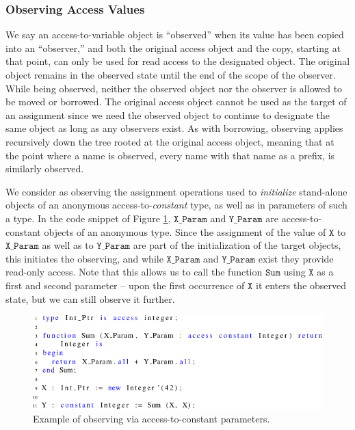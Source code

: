 \documentclass[runningheads]{llncs}
\newcommand\var[1]{\ensuremath{\mathtt{#1}}}
\newcommand{\keyword}[1]{\textsf{#1}}
\begin{document}
\subsubsection{Observing Access Values}
\label{sec:observing}

We say an access-to-variable object is ``observed'' when its value has been copied into an ``observer,'' and both the original
access object and the copy, starting at that point, can only be used for read access to the designated object.
The original object remains in the observed state until the end of the scope of the observer. While being observed, neither the observed object nor the observer is allowed to be moved or
borrowed. The original access object cannot be used as the target of an assignment since we need the observed object to continue
to designate the same object as long as any observers exist.  As with borrowing, observing applies recursively down the tree rooted at the original access object, meaning that at the point where a name is observed,
every name with that name as a prefix, is similarly observed.


We consider as observing the assignment operations used to \textit{initialize} stand-alone objects of an anonymous access-to-\textit{constant} type, as well as \keyword{in} parameters of such a type.
In the code snippet of Figure \ref{fig:observe_exp}, \var{X\_Param} and \var{Y\_Param} are access-to-constant objects of an anonymous type. Since the assignment of the value of \var{X} to \var{X\_Param}
as well as to \var{Y\_Param} are part of the initialization of the target objects, this initiates the observing, and while \var{X\_Param} and \var{Y\_Param} exist they provide read-only access. Note that
this allows us to call the function \var{Sum} using \var{X} as a first and second parameter -- upon the first occurrence of \var{X} it enters the observed state, but we can still observe it further.

\begin{figure}[htb!]
\centering
   \includegraphics[]{observe_ex1}
   \caption{Example of observing via access-to-constant parameters.}
   \label{fig:observe_exp}
\end{figure}
\end{document}

